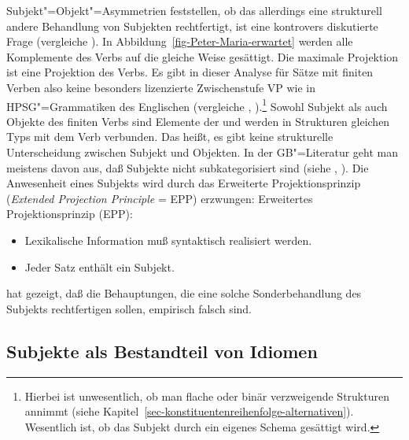 Subjekt"=Objekt"=Asymmetrien feststellen, ob das allerdings eine strukturell andere
Behandlung von Subjekten rechtfertigt, ist eine kontrovers diskutierte Frage 
(vergleiche \zb {}). 
In Abbildung~\vref{fig-Peter-Maria-erwartet} werden alle Komplemente des Verbs auf die gleiche Weise gesättigt.
Die maximale Projektion ist eine Projektion des Verbs.
Es gibt in dieser Analyse für Sätze mit finiten Verben
also keine besonders lizenzierte Zwischenstufe VP wie \zb in HPSG"=Grammatiken des Englischen 
(vergleiche , 
).\footnote{
	Hierbei ist unwesentlich, ob man flache oder binär verzweigende Strukturen
	annimmt (siehe Kapitel~\ref{sec-konstituentenreihenfolge-alternativen}). Wesentlich ist, ob das Subjekt durch
	ein eigenes Schema gesättigt wird.
}
% 
Sowohl Subjekt als auch Objekte des finiten Verbs sind Elemente der \subcatl und werden in Strukturen
gleichen Typs mit dem Verb verbunden.
Das heißt, es gibt keine strukturelle Unterscheidung zwischen Subjekt und 
Objekten. In der GB"=Literatur geht man meistens
davon aus, daß Subjekte nicht subkategorisiert sind (siehe \zb {}, ).
Die Anwesenheit eines Subjekts wird durch das Erweiterte Projektionsprinzip (\emph{Extended Projection
Principle} = EPP) erzwungen:
\ea
Erweitertes Projektionsprinzip (EPP):
\begin{itemize}
\item Lexikalische Information muß syntaktisch realisiert werden.
\item Jeder Satz enthält ein Subjekt. 
\end{itemize}
\z

\noindent
\citet[Kapitel~2]{Bresnan82c} hat gezeigt, daß die Behauptungen,
die eine solche Sonderbehandlung des Subjekts rechtfertigen sollen, empirisch falsch sind.


\subsection{Subjekte als Bestandteil von Idiomen}

